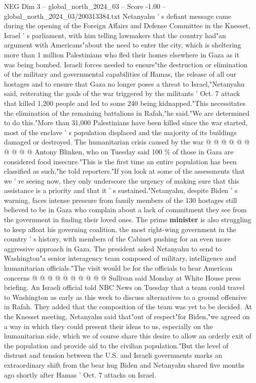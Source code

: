 \begin{textsample}{NEG Dim 3 – global\_north\_2024\_03 – Score -1.00 – global\_north\_2024\_03/200313384.txt}  \label{ex:f3_neg_188}
Netanyahu ' s defiant message came during the opening of the Foreign Affairs and Defense Committee in the Knesset, Israel ' s parliament, with him telling lawmakers that the country had"an argument with Americans"about the need to enter the city, which is sheltering more than 1 million Palestinians who fled their homes elsewhere in Gaza as it was being bombed.
Israeli forces needed to ensure"the destruction or elimination of the military and governmental capabilities of Hamas, the release of all our hostages and to ensure that Gaza no longer poses a threat to Israel,"Netanyahu said, reiterating the goals of the war triggered by the militants ' Oct. 7 attack that killed 1,200 people and led to some 240 being kidnapped."This necessitates the elimination of the remaining battalions in Rafah,"he said."We are determined to do this."More than 31,000 Palestinians have been killed since the war started, most of the enclave ' s population displaced and the majority of its buildings damaged or destroyed.
The humanitarian crisis caused by the war @ @ @ @ @ @ @ @ @ @ Antony Blinken, who on Tuesday said 100 \% of those in Gaza are considered food insecure."This is the first time an entire population has been classified as such,"he told reporters."If you look at some of the assessments that we ' re seeing now, they only underscore the urgency of making sure that this assistance is a priority and that it ' s sustained."Netanyahu, despite Biden ' s warning, faces intense pressure from family members of the 130 hostages still believed to be in Gaza who complain about a lack of commitment they see from the government in finding their loved ones.
The prime \textbf{minister} is also struggling to keep afloat his governing coalition, the most right-wing government in the country ' s history, with members of the Cabinet pushing for an even more aggressive approach in Gaza.
The president asked Netanyahu to send to Washington"a senior interagency team composed of military, intelligence and humanitarian officials."The visit would be for the officials to hear American concerns @ @ @ @ @ @ @ @ @ @ Sullivan said Monday at White House press briefing.
An Israeli official told NBC News on Tuesday that a team could travel to Washington as early as this week to discuss alternatives to a ground offensive in Rafah.
They added that the composition of the team was yet to be decided.
At the Knesset meeting, Netanyahu said that"out of respect"for Biden,"we agreed on a way in which they could present their ideas to us, especially on the humanitarian side, which we of course share this desire to allow an orderly exit of the population and provide aid to the civilian population."But the level of distrust and tension between the U.S. and Israeli governments marks an extraordinary shift from the bear hug Biden and Netanyahu shared five months ago shortly after Hamas ' Oct. 7 attacks on Israel.

\end{textsample}
